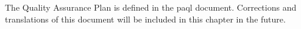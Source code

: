 
The Quality Assurance Plan is defined in the \ac{paql} document. Corrections and translations of this document will be included in this chapter in the future. 